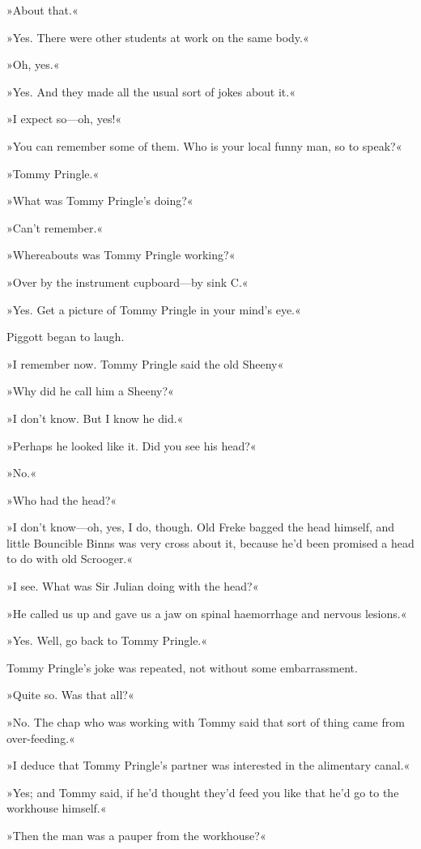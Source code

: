 »About that.«

»Yes. There were other students at work on the same body.«

»Oh, yes.«

»Yes. And they made all the usual sort of jokes about it.«

»I expect so—oh, yes!«

»You can remember some of them. Who is your local funny man, so to speak?«

»Tommy Pringle.«

»What was Tommy Pringle's doing?«

»Can't remember.«

»Whereabouts was Tommy Pringle working?«

»Over by the instrument cupboard—by sink C\@.«

»Yes. Get a picture of Tommy Pringle in your mind's eye.«

Piggott began to laugh.

»I remember now. Tommy Pringle said the old Sheeny\longdash«

»Why did he call him a Sheeny?«

»I don't know. But I know he did.«

»Perhaps he looked like it. Did you see his head?«

»No.«

»Who had the head?«

»I don't know—oh, yes, I do, though. Old Freke bagged the head himself, and little Bouncible Binns was very cross about it, because he'd been promised a head to do with old Scrooger.«

»I see. What was Sir Julian doing with the head?«

»He called us up and gave us a jaw on spinal haemorrhage and nervous lesions.«

»Yes. Well, go back to Tommy Pringle.«

Tommy Pringle's joke was repeated, not without some embarrassment.

»Quite so. Was that all?«

»No. The chap who was working with Tommy said that sort of thing came from over-feeding.«

»I deduce that Tommy Pringle's partner was interested in the alimentary canal.«

»Yes; and Tommy said, if he'd thought they'd feed you like that he'd go to the workhouse himself.«

»Then the man was a pauper from the workhouse?«

